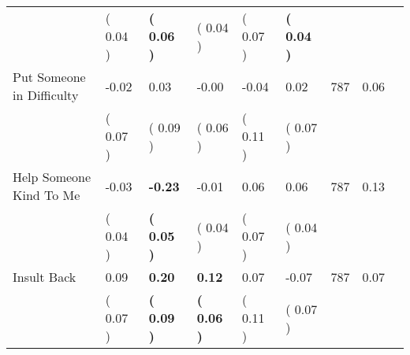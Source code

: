 \begin{tabular}{L{6.2cm} C{1.8cm} C{1.8cm} C{1.8cm} C{1.8cm} C{1.8cm} C{1.8cm} C{0.3cm} C{0.3cm}}
 & (     0.04 ) & \textbf{(     0.06 )} & (     0.04 ) & (     0.07 ) & \textbf{(     0.04 )}  & \\
Put Someone in Difficulty &     -0.02 &      0.03 &     -0.00 &     -0.04 &      0.02  & 787 &       0.06 \\ 
 & (     0.07 ) & (     0.09 ) & (     0.06 ) & (     0.11 ) & (     0.07 )  & \\
Help Someone Kind To Me &     -0.03 & \textbf{    -0.23} &     -0.01 &      0.06 &      0.06  & 787 &       0.13 \\ 
 & (     0.04 ) & \textbf{(     0.05 )} & (     0.04 ) & (     0.07 ) & (     0.04 )  & \\
Insult Back &      0.09 & \textbf{     0.20} & \textbf{     0.12} &      0.07 &     -0.07  & 787 &       0.07 \\ 
 & (     0.07 ) & \textbf{(     0.09 )} & \textbf{(     0.06 )} & (     0.11 ) & (     0.07 )  & \\
\bottomrule
\end{tabular}
